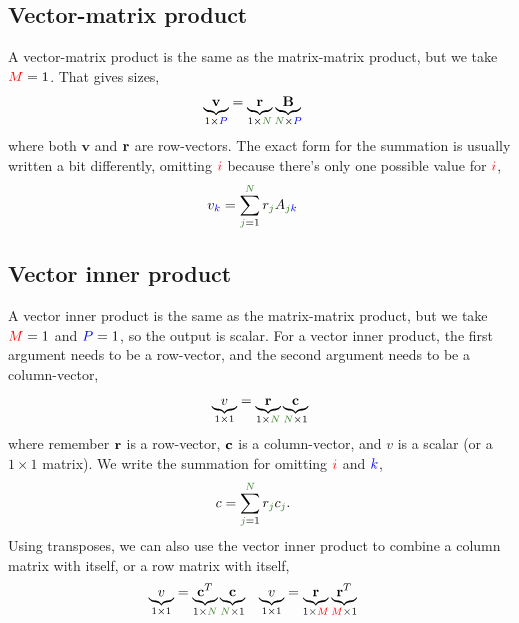 \documentclass{article}
\newcommand{\B}{\mathbf{B}}
\begin{document}
\subsection{Vector-matrix product}
A vector-matrix product is the same as the matrix-matrix product, but we take $\M=1$.
That gives sizes,
\begin{align}
  \underbrace{\mathbf{v}}_{1 \times \P} &= \underbrace{\r}_{1 \times \N} \underbrace{\B}_{\N \times \P}
\end{align}
where both $\mathbf{v}$ and $\r$ are row-vectors.
The exact form for the summation is usually written a bit differently, omitting $\i$ because there's only one possible value for $\i$,
\begin{align}
  v_{\k} &= \sum_{\j=1}^{\N} r_{\j} A_{\j\k}
\end{align}

\subsection{Vector inner product}
A vector inner product is the same as the matrix-matrix product, but we take $\M=1$ and $\P=1$, so the output is scalar.
For a vector inner product, the first argument needs to be a row-vector, and the second argument needs to be a column-vector,
\begin{align}
  \underbrace{v}_{1 \times 1} &= \underbrace{\r}_{1 \times \N} \underbrace{\c}_{\N \times 1}\\
\end{align}
where remember $\r$ is a row-vector,  $\c$ is a column-vector, and $v$ is a scalar (or a $1\times 1$ matrix).
We write the summation for omitting $\i$ and $\k$,
\begin{align}
  c &= \sum_{\j=1}^{\N} r_{\j} c_{\j}.
\end{align}
Using transposes, we can also use the vector inner product to combine a column matrix with itself, or a row matrix with itself,
\begin{align}
  \underbrace{v}_{1 \times 1} &= \underbrace{\c^T}_{1 \times \N} \underbrace{\c}_{\N \times 1} & 
  \underbrace{v}_{1 \times 1} &= \underbrace{\r}_{1 \times \M} \underbrace{\r^T}_{\M \times 1}
\end{align}
\end{document}
